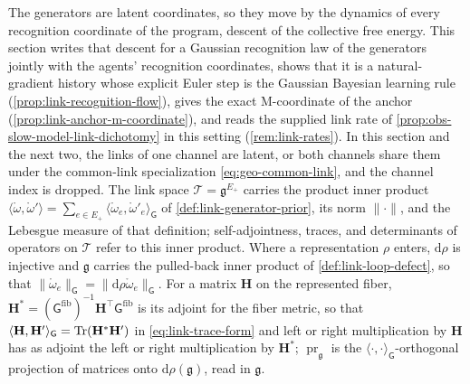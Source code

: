 The generators are latent coordinates, so they move by the dynamics of every recognition coordinate
of the program, descent of the collective free energy. This section writes that descent for a
Gaussian recognition law of the generators jointly with the agents' recognition coordinates, shows
that it is a natural-gradient history whose explicit Euler step is the Gaussian Bayesian learning
rule (\cref{prop:link-recognition-flow}), gives the exact M-coordinate of the anchor
(\cref{prop:link-anchor-m-coordinate}), and reads the supplied link rate of
\cref{prop:obs-slow-model-link-dichotomy} in this setting (\cref{rem:link-rates}). In this section
and the next two, the links of one channel are latent, or both channels share them under the
common-link specialization \eqref{eq:geo-common-link}, and the channel index is dropped. The link
space $\mathscr T=\mathfrak g^{E_+}$ carries the product inner product
$\langle\mathring\omega,\mathring\omega'\rangle=\sum_{e\in E_+}\langle\mathring\omega_e,\mathring\omega'_e\rangle_{\mathsf G}$
of \cref{def:link-generator-prior}, its norm $\lVert\cdot\rVert$, and the Lebesgue measure of that definition;
self-adjointness, traces, and determinants of operators on $\mathscr T$ refer to this inner product.
Where a representation $\rho$ enters, $\mathrm d\rho$ is injective and $\mathfrak g$ carries the
pulled-back inner product of \cref{def:link-loop-defect}, so that
$\lVert\mathring\omega_e\rVert_{\mathsf G}=\lVert\mathrm d\rho\mathring\omega_e\rVert_{\mathsf G}$. For a
matrix $\mathbf H$ on the represented fiber,
$\mathbf H^*=(\mathsf G^{\mathrm{fib}})^{-1}\mathbf H^\top\mathsf G^{\mathrm{fib}}$ is its adjoint for the
fiber metric, so that $\langle\mathbf H,\mathbf H'\rangle_{\mathsf G}=\operatorname{Tr}(\mathbf H^*\mathbf H')$ in
\eqref{eq:link-trace-form} and left or right multiplication by $\mathbf H$ has as adjoint the left or
right multiplication by $\mathbf H^*$; $\operatorname{pr}_{\mathfrak g}$ is the
$\langle\cdot,\cdot\rangle_{\mathsf G}$-orthogonal projection of matrices onto
$\mathrm d\rho(\mathfrak g)$, read in $\mathfrak g$.

